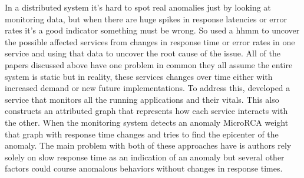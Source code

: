 In a distributed system it's hard to spot real anomalies just by looking at monitoring data, but when there are huge spikes in response latencies or error rates it's a good indicator something must be wrong. So \cite{samir2019dla} used a \ac{hhmm} to uncover the possible affected services from changes in response time or error rates in one service and using that data to uncover the root cause of the issue. All of the papers discussed above have one problem in common they all assume the entire system is static but in reality, these services changes over time either with increased demand or new future implementations. To address this, \cite{wu2020microrca} developed a service that monitors all the running applications and their vitals. This also constructs an attributed graph that represents how each service interacts with the other. When the monitoring system detects an anomaly MicroRCA weight that graph with response time changes and tries to find the epicenter of the anomaly. The main problem with both of these approaches have is authors rely solely on slow response time as an indication of an anomaly but several other factors could course anomalous behaviors without changes in response times.
